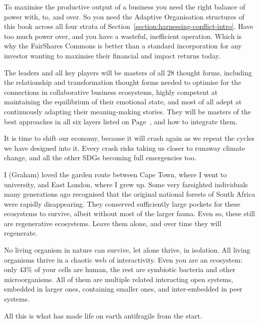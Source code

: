 To maximise the productive output of a business you need the right balance of power with, to, and over. So you need the Adaptive Organisation structures of this book across all four strata of Section~\ref{section:harnessing-conflict-intro}. Have too much power over, and you have a wasteful, inefficient operation. Which is why the FairShares Commons  is better than a standard incorporation for any investor wanting to maximise their financial and impact returns today. 


The leaders and all key players will be masters of all 28 thought forms, including the relationship and transformation thought forms needed to optimise for the connections in collaborative business ecosystems, highly competent at maintaining the equilibrium of their emotional state, and most of all adept at continuously adapting their meaning\hyp{}making stories. They will be masters of the best approaches in all six layers listed on Page~\pageref{list:six-layers}, and how to integrate them. 


It is time to shift our economy\cite{dekemmeter-shifting-economy}, because it will crash again\cite{guardian-groundhog-day} as we repeat the cycles we have designed into it. Every crash risks taking us closer to runaway climate change, and all the other SDGs  becoming full emergencies too.


\begin{longstoryblock}
I (Graham) loved the garden route between Cape Town, where I went to university, and East London, where I grew up.  Some very farsighted individuals many generations ago recognised that the original national forests of South Africa were rapidly disappearing. They conserved sufficiently large pockets for these ecosystems to survive, albeit without most of the larger fauna. Even so, these still are regenerative ecosystems. Leave them alone, and over time they will regenerate.
\end{longstoryblock}


No living organism in nature can survive, let alone thrive, in isolation. All living organisms thrive in a chaotic web of interactivity. Even you are an ecosystem: only 43\% of your cells are human, the rest are symbiotic bacteria and other microorganisms. All of them are multiple related interacting open systems, embedded in larger ones, containing smaller ones, and inter-embedded in peer systems. 


All this is what has made life on earth antifragile from the start.



